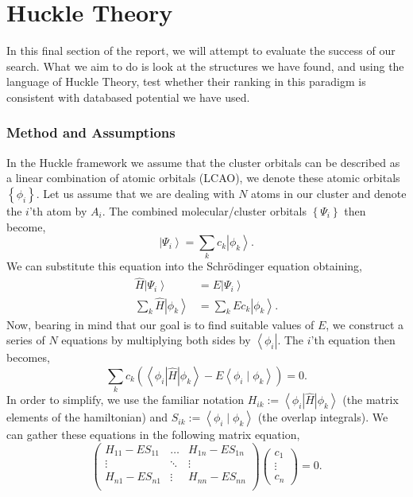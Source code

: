 %
%
%
%
%
\let\cleardoublepage\clearpage
\thispagestyle{fancy}
\chapter{Huckle Theory}
In this final section of the report, we will attempt to evaluate the success of our search. What we aim to do is look at the structures we have found, and using the language of Huckle Theory, test whether their ranking in this paradigm is consistent with databased potential we have used. 
\subsection{Method and Assumptions}
In the Huckle framework we assume that the cluster orbitals can be described as a linear combination of atomic orbitals (LCAO), we denote these atomic orbitals $\left\{ \phi_i  \right\} $. Let us assume that we are dealing with $N$ atoms in our cluster and denote the $i$'th atom by  $A_i$. The combined molecular/cluster orbitals $\left\{ \Psi_i \right\} $ then become,
\[
\left| \Psi_i \right> = \sum_k c_k \left|\phi _k \right>
.\] 
We can substitute this equation into the Schrödinger equation obtaining,
\begin{align*}
    \hat{H} \left| \Psi_i \right> &= E \left|\Psi_i \right> \\
    \sum_k \hat{H} \left|\phi _k \right> &= \sum_kE c_k\left| \phi _k\right>
.\end{align*}
Now, bearing in mind that our goal is to find suitable values of $E$, we construct a series of $N$ equations by multiplying both sides by $\left< \phi _i \right|$. The $i$'th equation then becomes,
 \[
\sum_k c_k \left( \left< \phi _i \left| \hat{H}\right|\phi _k \right> - E \left< \phi _i \mid \phi _k\right> \right) = 0
.\] 
In order to simplify, we use the familiar notation $H_{ik} := \left< \phi _i \right| \hat{H} \left|\phi _k \right>$ (the matrix elements of the hamiltonian) and $S_{ik} := \left<\phi _i  \mid \phi _k \right>$ (the overlap integrals). We can gather these equations in the following matrix equation,
\[
\begin{pmatrix}
    H_{11} - ES_{11} & \ldots &H_{1n} - ES_{1n} \\   
    \vdots & \ddots  &  \vdots \\
    H_{n1} - ES_{n1} & \vdots  &  H_{nn} - ES_{nn}\\ 
\end{pmatrix}
\begin{pmatrix} c_1\\ \vdots\\ c_n \end{pmatrix}
= 0
.\] 
